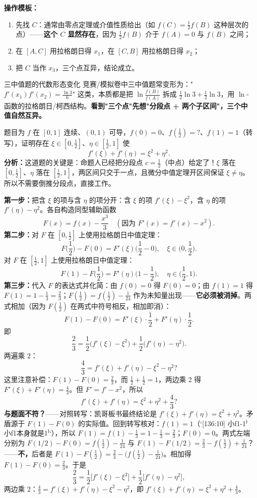 \documentclass[a4paper]{article}
\begin{document}
\textbf{操作模板：}
\begin{enumerate}
\item 先找 $C$：通常由零点定理或介值性质给出（如 $f(C)=\frac12 f(B)$ 这种层次的点）——\textbf{这个 $C$ 显然存在}，因为 $\frac12 f(B)$ 介于 $f(A)=0$ 与 $f(B)$ 之间；
\item 在 $[A,C]$ 用拉格朗日得 $x_1$，在 $[C,B]$ 用拉格朗日得 $x_2$；
\item 把 $C$ 当作 $x_3$，三个点互异，结论成立。
\end{enumerate}

\begin{warningbox}{三中值题的代数形态变化}
竞赛/模拟卷中三中值题常变形为："$f'(x_1)f'(x_2)=\frac{\ln 3}{6}$" 这类，本质都是把 $\ln\frac{f(B)}{f(A)}$ 拆成 $\frac12\ln 3+\frac12\ln 3$，用 $\ln$-函数的拉格朗日/柯西结构。\textbf{看到"三个点"先想"分段点 + 两个子区间"，三个中值自然互异。}
\end{warningbox}题目为 $f$ 在 $[0,1]$ 连续、$(0,1)$ 可导，$f(0)=0$、$f(\frac12)=?$、$f(1)=1$（转写），证明存在 $\xi\in[0,\frac12]$、$\eta\in[\frac12,1]$ 使
\[
f'(\xi)+f'(\eta)=\xi^{2}+\eta^{2} .
\]
\textbf{分析：}这道题的关键是：命题人已经把分段点 $c=\frac12$（中点）给定了！$\xi$ 落在 $[0,\frac12]$、$\eta$ 落在 $[\frac12,1]$，两区间只交于一点，且微分中值定理开区间保证 $\xi\neq\eta$。所以不需要倒推分段点，直接工作。

\textbf{第一步：}把含 $\xi$ 的项与含 $\eta$ 的项分开：含 $\xi$ 的项 $f'(\xi)-\xi^{2}$，含 $\eta$ 的项 $f'(\eta)-\eta^{2}$。各自构造同型辅助函数
\[
F(x)=f(x)-\frac{x^{3}}{3}\quad\left(\text{因为 } F'(x)=f'(x)-x^{2}\right).
\]
\textbf{第二步：}对 $F$ 在 $[0,\frac12]$ 上使用拉格朗日中值定理：
\[
F\Big(\frac12\Big)-F(0)=F'(\xi)\Big(\frac12-0\Big),\quad \xi\in\Big(0,\frac12\Big).
\]
对 $F$ 在 $[\frac12,1]$ 上使用拉格朗日中值定理：
\[
F(1)-F\Big(\frac12\Big)=F'(\eta)\Big(1-\frac12\Big),\quad \eta\in\Big(\frac12,1\Big).
\]
\textbf{第三步：}代入 $F$ 的表达式并化简：由 $f(0)=0$ 得 $F(0)=0$；由 $f(1)=1$ 得 $F(1)=1-\frac13=\frac23$；$F(\frac12)=f(\frac12)-\frac1{24}$ 作为未知量出现——\textbf{它必须被消掉}。两式相加（因为 $F(\frac12)$ 在两式中符号相反，相加即消）：
\[
F(1)-F(0)=F'(\xi)\cdot\frac12+F'(\eta)\cdot\frac12 .
\]
即
\[
\frac23=\frac12\Big(f'(\xi)-\xi^{2}\Big)+\frac12\Big(f'(\eta)-\eta^{2}\Big).
\]
两遍乘 2：
\[
\frac43=f'(\xi)+f'(\eta)-\xi^{2}-\eta^{2} ?
\]
这里注意补偿：$F(1)-F(0)=\frac23$，而 $\frac12+\frac12=1$，两边乘 2 得 $F'(\xi)+F'(\eta)=\frac43$。但 $F'=f'-x^2$，所以
\[
f'(\xi)+f'(\eta)=\xi^{2}+\eta^{2}+\frac43 ?
\]
\textbf{与题面不符？}——对照转写：凯哥板书最终结论是 $f'(\xi)+f'(\eta)=\xi^{2}+\eta^{2}$。矛盾源于 $F(1)-F(0)$ 的实际值。回到转写核对：$f(1)=1$（`[136:10] 小f1-1⁾ 小f1本身就是1⁾`），所以 $F(1)=f(1)-\frac13=1-\frac13=\frac23$；$F(0)=0$。两式左端分别为 $F(1/2)-F(0)=f(\frac12)-\frac1{24}$ 与 $F(1)-F(1/2)=\frac23-f(\frac12)+\frac1{24}$？——\textbf{不，}后者是 $F(1)-F(\frac12)=\frac23-\Big(f(\frac12)-\frac1{24}\Big)$。相加得 $F(1)-F(0)=\frac23$。于是
\[
\frac23=\frac12\Big[f'(\xi)-\xi^{2}\Big]+\frac12\Big[f'(\eta)-\eta^{2}\Big],
\]
两边乘 2：$\frac43=f'(\xi)+f'(\eta)-\xi^{2}-\eta^{2}$，即 $f'(\xi)+f'(\eta)=\xi^{2}+\eta^{2}+\frac43$。
\end{document}
